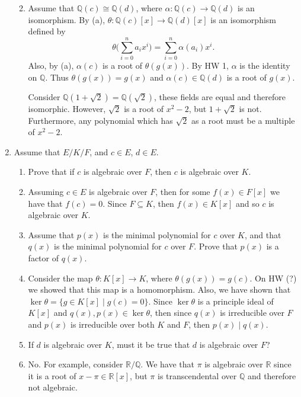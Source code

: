 \documentclass[leqno]{article}
\makeatletter
\theoremstyle{definition}
\theoremstyle{remark}
\let\oldproofname=\proofname
\renewcommand{\proofname}{\textit{\oldproofname}}
\theoremstyle{definition}
\renewenvironment{proof}[1][\proofname]{\par
  \pushQED{\qed}%
  \normalfont \topsep6\p@\@plus6\p@\relax
  \list{}{\leftmargin=0mm
          \rightmargin=0mm
          \settowidth{\itemindent}{\itshape#1}%
          \labelwidth=\itemindent
          \parsep=0pt \listparindent=0mm%
  }
  \item[\hskip\labelsep
        \itshape
    #1\@addpunct{.}]\ignorespaces
}{%
  \popQED\endlist\@endpefalse
}
\makeatother
\begin{document}
\begin{enumerate}[leftmargin=*]
\begin{enumerate}
\begin{proof}
                    Assume that $\mathbb{Q}(c)\cong\mathbb{Q}(d)$, where $\alpha\colon\mathbb{Q}(c)\rightarrow\mathbb{Q}(d)$ is an isomorphism. By (a), $\theta\colon\mathbb{Q}(c)[x]\rightarrow\mathbb{Q}(d)[x]$ is an isomorphism defined by 
                        \begin{equation*}
                            \theta\big(\sum_{i=0}^na_ix^i\big)=\sum_{i=0}^n\alpha(a_i)x^i.
                        \end{equation*}
                    Also, by (a), $\alpha(c)$ is a root of $\theta(g(x))$. By HW 1, $\alpha$ is the identity on $\mathbb{Q}$. Thus $\theta(g(x))=g(x)$ and $\alpha(c)\in\mathbb{Q}(d)$ is a root of $g(x)$.\par\hspace{4mm} Consider $\mathbb{Q}(1+\sqrt{2})=\mathbb{Q}(\sqrt{2})$, these fields are equal and therefore isomorphic. However, $\sqrt{2}$ is a root of $x^2-2$, but $1+\sqrt{2}$ is not. Furthermore, any polynomial which has $\sqrt{2}$ as a root must be a multiple of $x^2-2$.
                \end{proof}
        \end{enumerate}
    \item Assume that $E/K/F$, and $c\in E$, $d\in E$.\hfill\par
        \begin{enumerate}
            \item Prove that if $c$ is algebraic over $F$, then $c$ is algebraic over $K$.
                \begin{proof}
                    Assuming $c\in E$ is algebraic over $F$, then for some $f(x)\in F[x]$ we have that $f(c)=0$. Since $F\subseteq K$, then $f(x)\in K[x]$ and so $c$ is algebraic over $K$.
                \end{proof}
            \item Assume that $p(x)$ is the minimal polynomial for $c$ over $K$, and that $q(x)$ is the minimal polynomial for $c$ over $F$. Prove that $p(x)$ is a factor of $q(x)$.
                \begin{proof}
                    Consider the map $\theta\colon K[x]\rightarrow K$, where $\theta(g(x))=g(c)$. On HW (?) we showed that this map is a homomorphism. Also, we have shown that $\ker\theta=\{g\in K[x]\mid g(c)=0\}$. Since $\ker\theta$ is a principle ideal of $K[x]$ and $q(x),p(x)\in\ker\theta$, then since $q(x)$ is irreducible over $F$ and $p(x)$ is irreducible over both $K$ and $F$, then $p(x)\mid q(x)$.
                \end{proof}
            \item If $d$ is algebraic over $K$, must it be true that $d$ is algebraic over $F$?
                \begin{proof}
                    No. For example, consider $\mathbb{R}/\mathbb{Q}$. We have that $\pi$ is algebraic over $\mathbb{R}$ since it is a root of $x-\pi\in\mathbb{R}[x]$, but $\pi$ is transcendental over $\mathbb{Q}$ and therefore not algebraic.
                \end{proof}
        \end{enumerate}
\end{enumerate}
\end{document}
